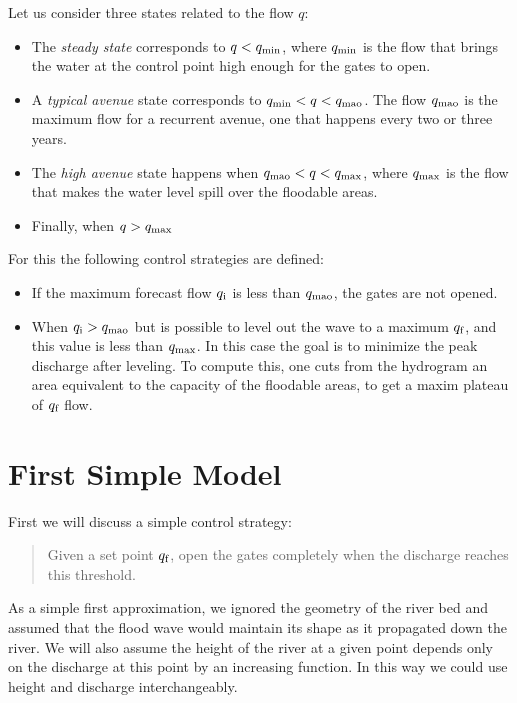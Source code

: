 Let us consider three states related to the flow $q$:
\begin{itemize}
\item The \emph{steady state} corresponds to $q<q_{\mbox{\scriptsize min}}$, where $q_{\mbox{\scriptsize min}}$
is the flow that brings the water at the control point high enough
for the gates to open. 
\item A\emph{ typical avenue} state corresponds to $q_{\mbox{\scriptsize min}}<q<q_{\mbox{\scriptsize mao}}$. The
flow $q_{\mbox{\scriptsize mao}}$ is the maximum flow for a recurrent avenue, one that
happens every two or three years. 
\item The \emph{high avenue} state happens when $q_{\mbox{\scriptsize mao}}<q<q_{\mbox{\scriptsize max}}$, where
$q_{\mbox{\scriptsize max}}$ is the flow that makes the water level spill over the floodable
areas. 
\item Finally, when $q>q_{\mbox{\scriptsize max}}$ 
\end{itemize}
For this the following control strategies are defined: 
\begin{itemize}
\item If the maximum forecast flow $q_{\mbox{\scriptsize i}}$ is less than $q_{\mbox{\scriptsize mao}}$, the gates
are not opened. 
\item When $q_{\mbox{\scriptsize i}}>q_{\mbox{\scriptsize mao}}$ but is possible to level out the wave to a maximum   $q_{\mbox{\scriptsize f}}$, and this value is less than $q_{\mbox{\scriptsize max}}$. In this case the goal is to minimize
the peak discharge after leveling. To compute this, one cuts from the hydrogram an area equivalent
to the capacity of the floodable areas, to get a maxim plateau of
$q_{\mbox{\scriptsize f}}$ flow. 
\end{itemize}







\section{First Simple Model} %

First we will discuss a simple control strategy:
\begin{quote}
	Given a set point $q_{\mbox{\scriptsize f}}$, open the gates completely when the discharge reaches this threshold.
\end{quote}

As a simple first approximation, we ignored the geometry of the river bed and assumed that the flood wave would maintain its shape as it propagated down the river.
We will also assume the height  of the river at a given point depends only on the discharge at this point by an increasing function.
In this way we could use height  and discharge interchangeably.

